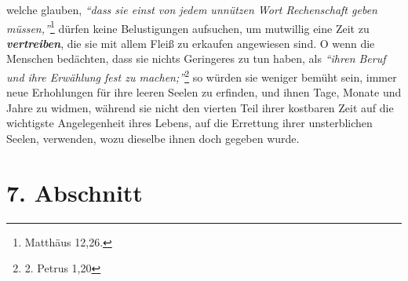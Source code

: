 welche glauben,
\textit{"`dass sie einst von jedem unnützen Wort Rechenschaft geben
müssen,"'}\footnote{Matthäus 12,26.}
dürfen keine Belustigungen aufsuchen, um
mutwillig eine Zeit zu \textbf{\textit{vertreiben}}, die sie mit allem Fleiß zu
erkaufen
angewiesen sind. O wenn die Menschen bedächten, dass sie nichts Geringeres zu
tun haben, als
\textit{"`ihren Beruf und ihre Erwählung fest zu machen;"'}\footnote{2. Petrus
1,20}
so würden sie weniger bemüht sein, immer neue Erhohlungen für ihre
leeren Seelen zu erfinden, und ihnen Tage, Monate und Jahre zu widmen, während
sie nicht den vierten Teil ihrer kostbaren Zeit auf die wichtigste
Angelegenheit ihres Lebens, auf die Errettung ihrer unsterblichen Seelen,
verwenden, wozu dieselbe ihnen doch gegeben wurde.

\section{7. Abschnitt} \label{kap15_ab7}

